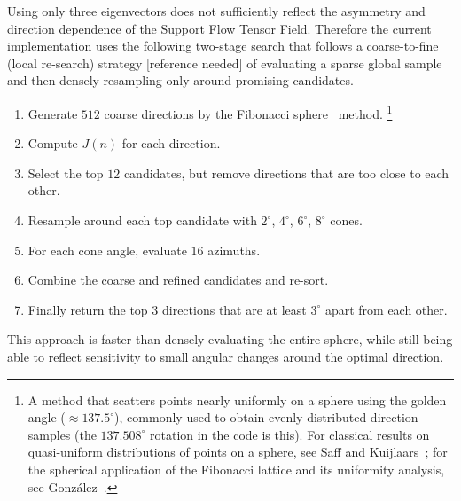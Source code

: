 \documentclass[11pt,a4paper]{article}
\begin{document}
Using only three eigenvectors does not sufficiently reflect the asymmetry and direction dependence of the Support Flow Tensor Field.
Therefore the current implementation uses the following two-stage search that follows a coarse-to-fine (local re-search) strategy [reference needed]
of evaluating a sparse global sample and then densely resampling only around promising candidates.

\begin{enumerate}
\item Generate $512$ coarse directions by the Fibonacci sphere~\cite{saff1997,gonzalez2010} method.%
\footnote{A method that scatters points nearly uniformly on a sphere using the golden angle ($\approx137.5^\circ$),
commonly used to obtain evenly distributed direction samples (the $137.508^\circ$ rotation in the code is this).
For classical results on quasi-uniform distributions of points on a sphere, see Saff and Kuijlaars~\cite{saff1997};
for the spherical application of the Fibonacci lattice and its uniformity analysis, see González~\cite{gonzalez2010}.}
\item Compute $J(n)$ for each direction.
\item Select the top $12$ candidates, but remove directions that are too close to each other.
\item Resample around each top candidate with $2^\circ$, $4^\circ$, $6^\circ$, $8^\circ$ cones.
\item For each cone angle, evaluate $16$ azimuths.
\item Combine the coarse and refined candidates and re-sort.
\item Finally return the top 3 directions that are at least $3^\circ$ apart from each other.
\end{enumerate}

This approach is faster than densely evaluating the entire sphere,
while still being able to reflect sensitivity to small angular changes around the optimal direction.
\end{document}
